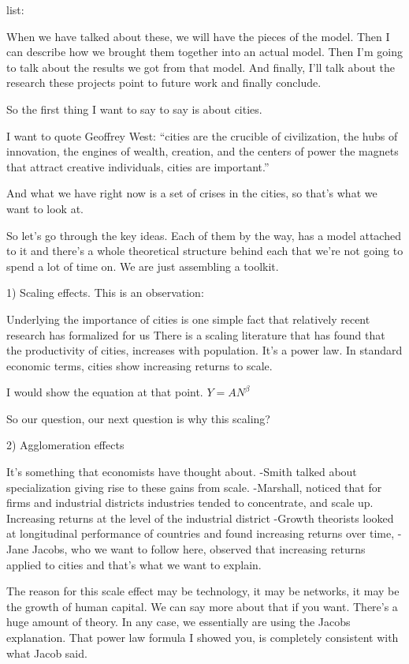 list: 

When we have talked about these, we will have the pieces of the model. 
Then I can describe how we brought them together into an actual model.
Then I'm going to talk about the results we got from that model. 
And finally, I'll talk about the research these projects point to future work and finally conclude. 

So the first thing  I want to say to say is about cities. 

I want to quote Geoffrey West:
``cities are the crucible of civilization, the hubs of innovation, the engines of wealth, creation, and the centers of power the magnets that attract creative individuals, cities are important.''


And what we have right now is a set of crises in the cities, so that's what we want to look at. 


So let's go through the key ideas. Each of them by the way, has a model attached to it and there's a whole theoretical structure behind each that we're not going to spend a lot of time on. We are just assembling a toolkit. 


1) Scaling effects. This is an observation:

Underlying the importance of cities is one simple fact that relatively recent research has formalized for us There is a  scaling literature that has found that the productivity of cities, increases with population. It's a power law.
In standard economic terms, cities show increasing returns to scale.


I would show the equation at that point. 
$Y=AN^\beta$

So our question, our next question is why this scaling?

2) Agglomeration effects
 
It's something that economists have thought about.
-Smith talked about specialization giving rise to these gains from scale. 
-Marshall, noticed that for firms and industrial districts industries tended to concentrate, and scale up. Increasing returns at the level of the industrial district
-Growth  theorists looked at longitudinal performance of countries and found increasing returns over time, 
-Jane Jacobs, who we want to follow here,  observed that increasing returns applied to cities and that's what we want to explain.


The reason for this scale effect may be technology, it may be networks, it may be the growth of human capital. We can say more about that if you want. There's a huge amount of theory. In any case, we essentially are using the Jacobs explanation. That power law formula I showed you, is completely consistent with what Jacob said.

